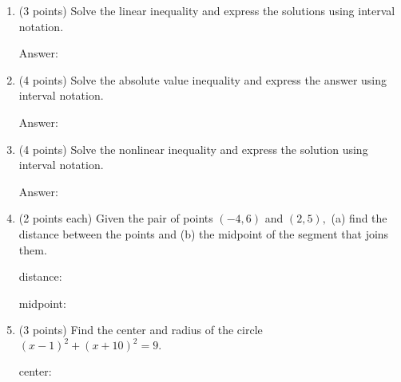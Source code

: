 \documentclass[11pt]{article}
\begin{document}
\begin{enumerate}
\item (3 points) Solve the linear inequality \scalebox{1.2}{$-3 \leq 4-5x <9$} and express the solutions using interval notation.

\begin{flushright}{Answer: \underline{\hspace{2in}}}\end{flushright}

\vspace{1in}
    \item (4 points) Solve the absolute value inequality  and express the answer using interval notation.

\begin{flushright}{Answer: \underline{\hspace{2in}}}\end{flushright}
\vspace{1in}
\item (4 points) Solve the nonlinear inequality \scalebox{1.2}{$(x+2)(x-3) < 0$} and express the solution using interval notation.

\begin{flushright}{Answer: \underline{\hspace{2in}}}\end{flushright}
\vfill
\item (2 points each) Given the pair of points $(-4,6)$ and $(2,5),$ (a) find the distance between the points and (b) the midpoint of the segment that joins them.

\begin{flushright}{distance: \underline{\hspace{2in}}}\end{flushright}

\begin{flushright}{midpoint: \underline{\hspace{2in}}}\end{flushright}

\vspace{0.25in}
\newpage
\item (3 points) Find the center and radius of the circle $(x-1)^2+(x+10)^2=9.$

\begin{flushright}{center: \underline{\hspace{2in}}}\end{flushright}


\end{enumerate}
\end{document}
